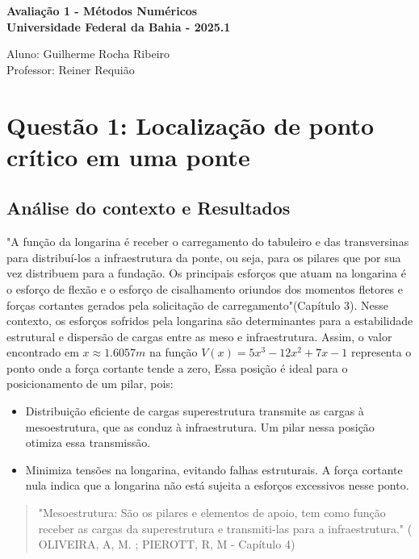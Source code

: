\documentclass{article}
\begin{document}
\begin{center}
\large\textbf{Avaliação 1 - Métodos Numéricos} \\
\large\textbf{ Universidade Federal da Bahia - 2025.1} \\
\end{center}

\begin{flushleft}
Aluno: Guilherme Rocha Ribeiro \\
Professor: Reiner Requião \\
\end{flushleft}

\section*{Questão 1: Localização de ponto crítico em uma ponte}
\justifying

\subsection*{Análise do contexto e Resultados}
"A função da longarina é receber o carregamento do tabuleiro e das transversinas para distribuí-los a infraestrutura da ponte, ou seja, para os pilares 
que por sua vez distribuem para a fundação. Os principais esforços que atuam na longarina é o esforço de flexão e o esforço de cisalhamento oriundos dos 
momentos fletores e forças cortantes gerados pela solicitação de carregamento"\cite{oliveira2016}(Capítulo 3). Nesse contexto, os esforços sofridos pela longarina são determinantes para a estabilidade estrutural e dispersão de cargas entre as meso e infraestrutura.
Assim, o valor encontrado em $x \approx 1.6057m$ na função $V(x) = 5x^3 - 12x^2 + 7x - 1$ representa o ponto onde a força cortante tende a zero, Essa posição é ideal para o posicionamento de um pilar, pois:

\begin{itemize}
\item Distribuição eficiente de cargas superestrutura transmite as cargas à mesoestrutura, que as conduz à infraestrutura. Um pilar nessa posição otimiza essa transmissão.
\item Minimiza tensões na longarina, evitando falhas estruturais. A força cortante nula indica que a longarina não está sujeita a esforços excessivos nesse ponto.
\end{itemize}


\begin{quote}
"Mesoestrutura: São os pilares e elementos de apoio, tem como função receber as cargas da superestrutura e transmiti-las para a infraestrutura." ( OLIVEIRA, A, M. ; PIEROTT, R, M - Capítulo 4) \cite{oliveira2016}   
\end{quote}
\end{document}
